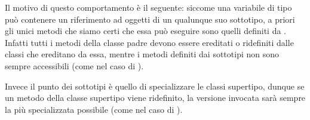 Il motivo di questo comportamento è il seguente: siccome una variabile di tipo  può contenere un riferimento ad oggetti di un qualunque suo sottotipo, a priori gli unici metodi che siamo certi che essa può eseguire sono quelli definiti da . Infatti tutti i metodi della classe padre devono essere ereditati o ridefiniti dalle classi che ereditano da essa, mentre i metodi definiti dai sottotipi non sono sempre accessibili (come nel caso di ).

Invece il punto dei sottotipi è quello di specializzare le classi supertipo, dunque se un metodo della classe supertipo viene ridefinito, la versione invocata sarà sempre la più specializzata possibile (come nel caso di ).